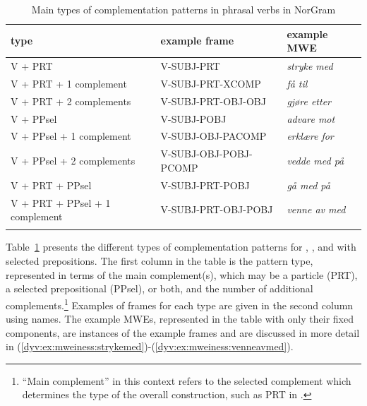 \documentclass[output=paper]{langsci/langscibook}
\begin{document}
\begin{table}
  \begin{tabular}{l@{~}l@{~}l}
    \lsptoprule
    type & example frame & example MWE \\
    \midrule
    V + PRT & V-SUBJ-PRT & \emph{stryke med} \\
    V + PRT + 1 complement & V-SUBJ-PRT-XCOMP & \emph{få til} \\
    V + PRT + 2 complements & V-SUBJ-PRT-OBJ-OBJ & \emph{gjøre etter}\\     \hline
    V + PPsel & V-SUBJ-POBJ & \emph{advare mot} \\
    V + PPsel + 1 complement  & V-SUBJ-OBJ-PACOMP & \emph{erklære for} \\
    V + PPsel + 2 complements & V-SUBJ-OBJ-POBJ-PCOMP & \emph{vedde med på} \\ \hline
    V + PRT + PPsel & V-SUBJ-PRT-POBJ & \emph{gå med på} \\
    V + PRT + PPsel + 1 complement & V-SUBJ-PRT-OBJ-POBJ & \emph{venne av med} \\ %
    \lspbottomrule
  \end{tabular}
  \caption{Main types of complementation patterns in phrasal verbs in NorGram}
  \label{dyv:tab:mweiness:phrasaltypes}
\end{table}

Table~\ref{dyv:tab:mweiness:phrasaltypes} presents the different types of complementation patterns for , , and  with selected prepositions.
The first column in the table is the pattern type, represented in terms of the main complement(s), which may be a particle (PRT), a selected prepositional  (PPsel), or both, and the number of additional complements.\footnote{``Main complement'' in this context refers to the selected complement which determines the type of the overall construction, such as PRT in .} 
Examples of  frames for each type are given in the second column using  names.
The example MWEs, represented in the table with only their fixed components, are instances of the example frames and are discussed in more detail in (\ref{dyv:ex:mweiness:strykemed})-(\ref{dyv:ex:mweiness:venneavmed}).
\end{document}
